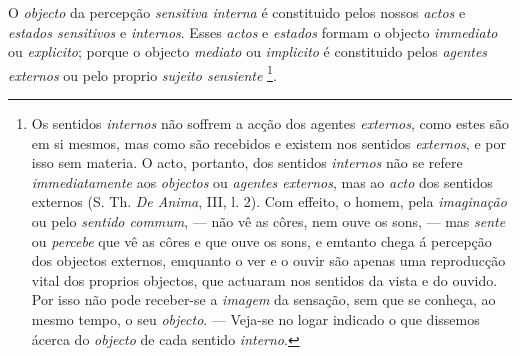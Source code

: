 O \emph{objecto} da percepção \emph{sensitiva interna} é constituido pelos nossos \emph{actos} e \emph{estados sensitivos} e \emph{internos}. Esses \emph{actos} e \emph{estados} formam o objecto \emph{immediato} ou \emph{explicito}; porque o objecto \emph{mediato} ou \emph{implicito} é constituido pelos \emph{agentes externos} ou pelo proprio \emph{sujeito sensiente} \footnote{Os sentidos \emph{internos} não soffrem a acção dos agentes \emph{externos}, como estes são em si mesmos, mas como são recebidos e existem nos sentidos \emph{externos}, e por isso sem materia. O acto, portanto, dos sentidos \emph{internos} não se refere \emph{immediatamente} aos \emph{objectos} ou \emph{agentes externos}, mas ao \emph{acto} dos sentidos externos (S. Th. \emph{De Anima}, III, l. 2). Com effeito, o homem, pela \emph{imaginação} ou pelo \emph{sentido commum}, --- não vê as côres, nem ouve os sons, --- mas \emph{sente} ou \emph{percebe} que vê as côres e que ouve os sons, e emtanto chega á percepção dos objectos externos, emquanto o ver e o ouvir são apenas uma reproducção vital dos proprios objectos, que actuaram nos sentidos da vista e do ouvido. Por isso não pode receber-se a \emph{imagem} da sensação, sem que se conheça, ao mesmo tempo, o seu \emph{objecto}. --- Veja-se no logar indicado o que dissemos ácerca do \emph{objecto} de cada sentido \emph{interno}.}.


